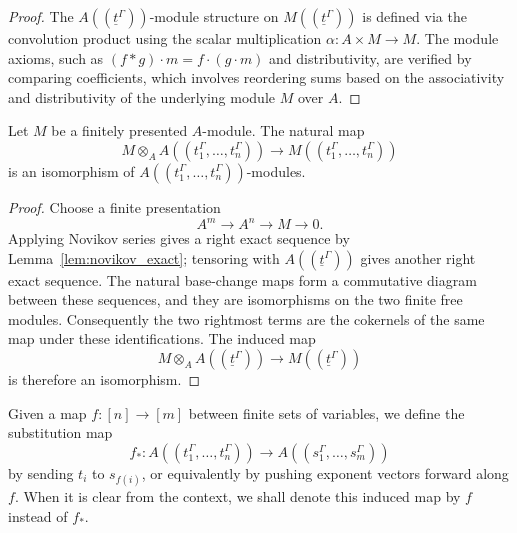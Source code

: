 \begin{proof}
  \leanok
  The $A((\underline{t}^\Gamma))$-module structure on $M((\underline{t}^\Gamma))$ is defined via the
  convolution product using the scalar multiplication $\alpha \colon A \times M \to M$.
  The module axioms, such as $(f \ast g) \cdot m = f \cdot (g \cdot m)$ and distributivity,
  are verified by comparing coefficients, which involves reordering sums based on the associativity
  and distributivity of the underlying module $M$ over $A$.
\end{proof}

\begin{theorem}
  \label{thm:novikov_base_change}
  \leanok
  Let $M$ be a finitely presented $A$-module. The natural map
  \[ M \otimes_A A((t_1^\Gamma, \dotsc, t_n^\Gamma)) \to M((t_1^\Gamma, \dotsc, t_n^\Gamma)) \]
  is an isomorphism of $A((t_1^\Gamma, \dotsc, t_n^\Gamma))$-modules.
\end{theorem}

\begin{proof}
  \leanok
  Choose a finite presentation
  \[
    A^m\longrightarrow A^n\longrightarrow M\longrightarrow0.
  \]
  Applying Novikov series gives a right exact sequence by
  Lemma~\ref{lem:novikov_exact}; tensoring with
  $A((\underline{t}^\Gamma))$ gives another right exact sequence.  The natural
  base-change maps form a commutative diagram between these sequences, and
  they are isomorphisms on the two finite free modules.  Consequently the two
  rightmost terms are the cokernels of the same map under these
  identifications.  The induced map
  \[
    M\otimes_A A((\underline{t}^\Gamma))
      \longrightarrow M((\underline{t}^\Gamma))
  \]
  is therefore an isomorphism.
\end{proof}

\begin{definition}
  \label{def:novikov_substitute}
  \leanok
  Given a map $f \colon [n] \to [m]$ between finite sets of variables, we
  define the substitution map
  \[
    f_\ast \colon A((t_1^\Gamma, \dotsc, t_n^\Gamma)) \longrightarrow
      A((s_1^\Gamma, \dotsc, s_m^\Gamma))
  \]
  by sending $t_i$ to $s_{f(i)}$, or equivalently by pushing exponent vectors
  forward along $f$. When it is clear from the context, we shall denote this
  induced map by $f$ instead of $f_\ast$.
\end{definition}


